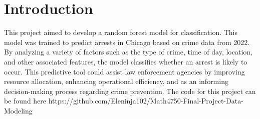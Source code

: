 \section{Introduction}
\label{sec:intro}
This project aimed to develop a random forest model for classification. This model was trained to predict arrests in Chicago based on crime data from 2022. By analyzing a variety of factors such as the type of crime, time of day, location, and other associated features, the model classifies whether an arrest is likely to occur. This predictive tool could assist law enforcement agencies by improving resource allocation, enhancing operational efficiency, and as an informing decision-making process regarding crime prevention. The code for this project can be found here https://github.com/Eleninja102/Math4750-Final-Project-Data-Modeling
